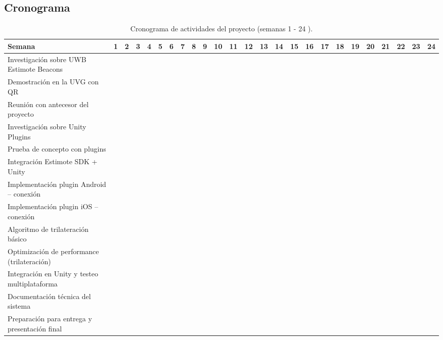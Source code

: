 \documentclass{article}
\begin{document}
\newpage
\begin{landscape}
    \section{Cronograma}

    \begin{table}[H]
    \centering
    \small
    \begin{tabular}{@{}lcccccccccccccccccccccccc@{}}
        \toprule
        \textbf{Semana}                                               & 1 & 2 & 3 & 4 & 5 & 6 & 7 & 8 & 9 & 10 & 11 & 12 & 13 & 14 & 15 & 16 & 17 & 18 & 19 & 20 & 21 & 22 & 23 & 24  \\ 
        \midrule
        Investigación sobre UWB Estimote Beacons                      & & & & & & & & & & & & & & & & & & & & & & & & \\ 
        Demostración en la UVG con QR                                 & & & & & & & & & & & & & & & & & & & & & & & & \\ 
        Reunión con antecesor del proyecto                            & & & & & & & & & & & & & & & & & & & & & & & & \\ 
        Investigación sobre Unity Plugins                             & & & & & & & & & & & & & & & & & & & & & & & & \\ 
        Prueba de concepto con plugins                                & & & & & & & & & & & & & & & & & & & & & & & & \\ 
        Integración Estimote SDK + Unity                              & & & & & & & & & & & & & & & & & & & & & & & & \\ 
        Implementación plugin Android – conexión                      & & & & & & & & & & & & & & & & & & & & & & & & \\ 
        Implementación plugin iOS – conexión                          & & & & & & & & & & & & & & & & & & & & & & & & \\ 
        Algoritmo de trilateración básico                             & & & & & & & & & & & & & & & & & & & & & & & & \\ 
        Optimización de performance (trilateración)                   & & & & & & & & & & & & & & & & & & & & & & & & \\ 
        Integración en Unity y testeo multiplataforma                 & & & & & & & & & & & & & & & & & & & & & & & & \\ 
        Documentación técnica del sistema                             & & & & & & & & & & & & & & & & & & & & & & & & \\ 
        Preparación para entrega y presentación final                 & & & & & & & & & & & & & & & & & & & & & & & & \\ 
        \bottomrule
    \end{tabular}
    \caption{Cronograma de actividades del proyecto (semanas 1 - 24 ).}
    \end{table}



\end{landscape}
\end{document}
